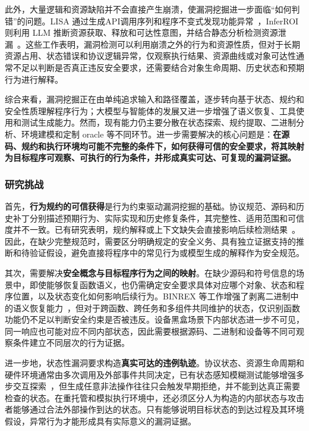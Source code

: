 此外，大量逻辑和资源缺陷并不会直接产生崩溃，使漏洞挖掘进一步面临“如何判错”的问题。LISA 通过生成API调用序列和程序不变式发现功能异常~\cite{lisa}，InferROI 则利用 LLM 推断资源获取、释放和可达性意图，并结合静态分析检测资源泄漏~\cite{inferroi}。这些工作表明，漏洞检测可以利用崩溃之外的行为和资源性质，但对于长期资源占用、状态错误和协议逻辑异常，仅观察执行结果、资源曲线或对象可达性通常不足以判断是否真正违反安全要求，还需要结合对象生命周期、历史状态和预期行为进行解释。

综合来看，漏洞挖掘正在由单纯追求输入和路径覆盖，逐步转向基于状态、规约和安全性质理解程序行为；大模型与智能体的发展又进一步增强了语义恢复、工具使用和测试生成能力。然而，现有能力仍主要分散在状态探索、规约提取、二进制分析、环境建模和定制 oracle 等不同环节。进一步需要解决的核心问题是：\textbf{在源码、规约和执行环境均可能不完整的条件下，如何获得可信的安全要求，将其映射为目标程序可观察、可执行的行为条件，并形成真实可达、可复现的漏洞证据。}

\subsubsection{研究挑战}

首先，\textbf{行为规约的可信获得}是行为约束驱动漏洞挖掘的基础。协议规范、源码和历史补丁分别描述预期行为、实际实现和历史修复条件，其完整性、适用范围和可信度并不一致。已有研究表明，规约解释或上下文缺失会直接影响后续检测结果~\cite{protocolguard,typatch}。因此，在缺少完整规范时，需要区分明确规定的安全义务、具有独立证据支持的推断和待验证假设，避免直接将程序中的常见行为或模型生成的解释作为安全规范。

其次，需要解决\textbf{安全概念与目标程序行为之间的映射}。在缺少源码和符号信息的场景中，即使能够恢复函数语义，也仍需确定安全要求具体对应哪个对象、状态和程序位置，以及状态变化如何影响后续行为。BINREX 等工作增强了剥离二进制中的语义恢复能力~\cite{binrex}，但对于跨函数、跨任务和多组件共同维护的状态，仅识别函数功能仍不足以判断安全约束是否被违反。设备黑盒场景下内部状态进一步不可见，同一响应也可能对应不同内部状态，因此需要根据源码、二进制和设备等不同可观察条件建立不同层次的行为证据。

进一步地，状态性漏洞要求构造\textbf{真实可达的违例轨迹}。协议状态、资源生命周期和硬件环境通常由多次调用及外部事件共同决定，已有状态感知模糊测试能够增强多步交互探索~\cite{stateafl,chatafl}，但生成任意非法操作往往只会触发早期拒绝，并不能到达真正需要检查的状态。在重托管和模拟执行环境中，还必须区分人为构造的内部状态与攻击者能够通过合法外部操作到达的状态。只有能够说明目标状态的到达过程及其环境假设，异常行为才能形成具有实际意义的漏洞证据。

